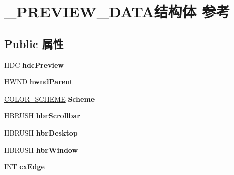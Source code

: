 \hypertarget{struct___p_r_e_v_i_e_w___d_a_t_a}{}\section{\+\_\+\+P\+R\+E\+V\+I\+E\+W\+\_\+\+D\+A\+T\+A结构体 参考}
\label{struct___p_r_e_v_i_e_w___d_a_t_a}
\subsection*{Public 属性}
\begin{DoxyCompactItemize}
\item 
\mbox{\label{struct___p_r_e_v_i_e_w___d_a_t_a_a7f845da857f34835390b533d6f5db7f4}} 
H\+DC {\bfseries hdc\+Preview}
\item 
\mbox{\label{struct___p_r_e_v_i_e_w___d_a_t_a_a4ed9e254ce990ed56c67297ec5072af3}} 
\hyperlink{interfacevoid}{H\+W\+ND} {\bfseries hwnd\+Parent}
\item 
\mbox{\label{struct___p_r_e_v_i_e_w___d_a_t_a_a0ea68e29f9f9c85fb3b23e236d188791}} 
\hyperlink{struct_c_o_l_o_r___s_c_h_e_m_e}{C\+O\+L\+O\+R\+\_\+\+S\+C\+H\+E\+ME} {\bfseries Scheme}
\item 
\mbox{\label{struct___p_r_e_v_i_e_w___d_a_t_a_a0b55b6e902da1c43abdfe4992d8a5561}} 
H\+B\+R\+U\+SH {\bfseries hbr\+Scrollbar}
\item 
\mbox{\label{struct___p_r_e_v_i_e_w___d_a_t_a_afd06e51656924baf380ae6aee59a675c}} 
H\+B\+R\+U\+SH {\bfseries hbr\+Desktop}
\item 
\mbox{\label{struct___p_r_e_v_i_e_w___d_a_t_a_a71608fc238fcd6a65e5b09811a174aac}} 
H\+B\+R\+U\+SH {\bfseries hbr\+Window}
\item 
\mbox{\label{struct___p_r_e_v_i_e_w___d_a_t_a_ab2c8b7ed072c3775edfbac67613192f4}} 
I\+NT {\bfseries cx\+Edge}
\item 
\mbox{\label{struct___p_r_e_v_i_e_w___d_a_t_a_aaf9f52ac66691e6fb3170a70e77f1fd5}} 

\end{DoxyCompactItemize}
